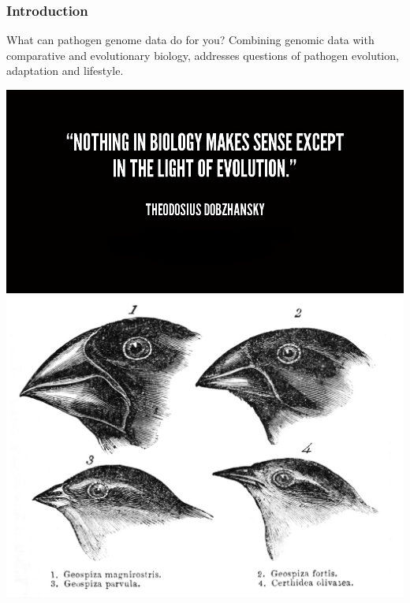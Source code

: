 
%
\begin{frame}
  \frametitle{Introduction}
    \begin{alertblock}{What can pathogen genome data do for you?}
      Combining genomic data with comparative and evolutionary biology, 
      addresses questions of pathogen evolution, adaptation and lifestyle.
    \end{alertblock}
    \begin{center}
      \includegraphics[height=0.3\textheight]{images/dobzhansky_quote}    
      \includegraphics[height=0.3\textheight]{images/darwin_finches}      
    \end{center}
\end{frame}
